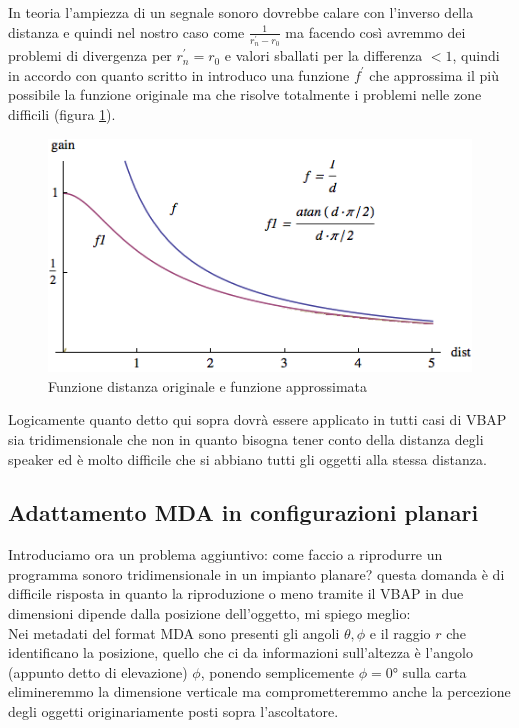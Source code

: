 \documentclass[12pt,a4paper]{report}
\begin{document}
In teoria l'ampiezza di un segnale sonoro dovrebbe calare con l'inverso della distanza e quindi nel nostro caso come $\frac{1}{r_n^{\prime}-r_0}$ ma facendo così avremmo dei problemi di divergenza per $r_n^{\prime}=r_0$ e valori sballati per la differenza $<1$, quindi in accordo con quanto scritto in \cite{distanza} introduco una funzione $f^{\prime}$ che approssima il più possibile la funzione originale ma che risolve totalmente i problemi nelle zone difficili (figura \ref{fig:distance}).\\

\begin{figure}[htbp]
	\centering
	\includegraphics[scale=0.60]{figures/distance.png}
	\caption {Funzione distanza originale e funzione approssimata}
	\label{fig:distance}
	\end{figure}

Logicamente quanto detto qui sopra dovrà essere applicato in tutti casi di VBAP sia tridimensionale che non in quanto bisogna tener conto della distanza degli speaker ed è molto difficile che si abbiano tutti gli oggetti alla stessa distanza.\\

\subsection{Adattamento MDA in configurazioni planari}

Introduciamo ora un problema aggiuntivo: come faccio a riprodurre un programma sonoro tridimensionale in un impianto planare? questa domanda è di difficile risposta in quanto la riproduzione o meno tramite il VBAP in due dimensioni dipende dalla posizione dell'oggetto, mi spiego meglio:\\

Nei metadati del format MDA sono presenti gli angoli $\theta, \phi$ e il raggio $r$ che identificano la posizione, quello che ci da informazioni sull'altezza è l'angolo (appunto detto di elevazione) $\phi$, ponendo semplicemente $\phi=0°$ sulla carta elimineremmo la dimensione verticale ma comprometteremmo anche la percezione degli oggetti originariamente posti sopra l'ascoltatore.\\
\end{document}
